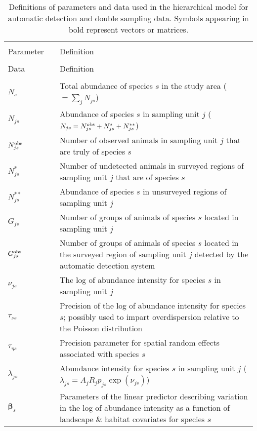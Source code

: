 \documentclass[12pt,fleqn]{article}
\begin{document}
\begin{flushleft}
\begin{longtable}{p{1.5cm}l p{14cm}}
\caption[Definitions of parameters and data]{Definitions of parameters and data used in the hierarchical model for automatic detection and double sampling data. Symbols appearing in bold represent vectors or matrices.}
\label{tab:defs} \\
\hline \hline \\
Parameter & & Definition \\
\cline{1-1} \cline{3-3}
\endfirsthead
\hline \hline \\
Data & & Definition \\
\cline{1-1} \cline{3-3}
\endhead
\hline
\endfoot
\hline
\endlastfoot
& & \\
$N_s$ & & Total abundance of species $s$ in the study area ($=\sum_j N_{js}$)\\
$N_{js}$ & & Abundance of species $s$ in sampling unit $j$ ($N_{js}=N_{js}^{\rm obs}+N_{js}^*+N_{js}^{**}$)\\
$N_{js}^{\rm obs}$ & & Number of observed animals in sampling unit $j$ that are truly of species $s$  \\
$N_{js}^*$ & & Number of undetected animals in surveyed regions of sampling unit $j$ that are of species $s$ \\
$N_{js}^{**}$ & & Abundance of species $s$ in unsurveyed regions of sampling unit $j$ \\
$G_{js}$   & & Number of groups of animals of species $s$ located in sampling unit $j$\\
$G_{js}^{\rm obs}$ & & Number of groups of animals of species $s$ located in the surveyed region of sampling unit $j$ detected by the automatic detection system \\
$\nu_{js}$ & & The log of abundance intensity for species $s$ in sampling unit $j$\\
$\tau_{\nu s}$ & & Precision of the log of abundance intensity for species $s$; possibly used to impart overdispersion relative to the Poisson distribution \\
$\tau_{\eta s}$ & & Precision parameter for spatial random effects associated with species $s$\\
$\lambda_{js}$ & & Abundance intensity for species $s$ in sampling unit $j$ ($\lambda_{js}=A_j R_j p_{js} \exp(\nu_{js})$)\\
$\boldsymbol{\beta}_s$ & & Parameters of the linear predictor describing variation in
        the log of abundance intensity as a function of landscape \& habitat covariates for species $s$\\

\end{longtable}
\end{flushleft}
\end{document}
